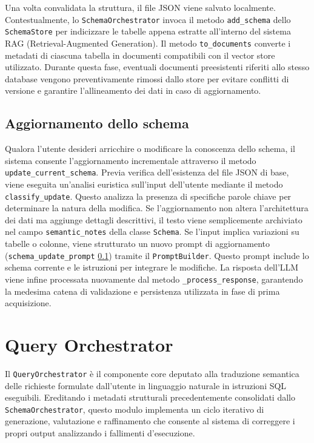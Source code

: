 Una volta convalidata la struttura, il file JSON viene salvato
localmente. Contestualmente, lo \texttt{SchemaOrchestrator} invoca il
metodo \texttt{add\_schema} dello \texttt{SchemaStore} per indicizzare
le tabelle appena estratte all'interno del sistema RAG
(Retrieval-Augmented Generation). Il metodo
\texttt{to\_documents} converte i metadati di ciascuna tabella in
documenti compatibili con il vector store utilizzato. Durante questa
fase, eventuali documenti preesistenti riferiti allo stesso database
vengono preventivamente rimossi dallo store per evitare conflitti di
versione e garantire l'allineamento dei dati in caso di aggiornamento.

\subsection{Aggiornamento dello
schema}\label{aggiornamento-dello-schema}

Qualora l'utente desideri arricchire o modificare la conoscenza dello
schema, il sistema consente l'aggiornamento incrementale attraverso il
metodo \texttt{update\_current\_schema}. Previa verifica dell'esistenza
del file JSON di base, viene eseguita un'analisi euristica sull'input
dell'utente mediante il metodo \texttt{classify\_update}. Questo
analizza la presenza di specifiche parole chiave per determinare la
natura della modifica. Se l'aggiornamento non altera l'architettura dei
dati ma aggiunge dettagli descrittivi, il testo viene semplicemente
archiviato nel campo \texttt{semantic\_notes} della classe
\texttt{Schema}. Se l'input implica variazioni su tabelle o colonne,
viene strutturato un nuovo prompt di aggiornamento
(\texttt{schema\_update\_prompt} \ref{aggiornamento-dello-schema}) tramite il \texttt{PromptBuilder}.
Questo prompt include lo schema corrente e le istruzioni per integrare
le modifiche. La risposta dell'LLM viene infine processata nuovamente
dal metodo \texttt{\_process\_response}, garantendo la medesima catena
di validazione e persistenza utilizzata in fase di prima acquisizione.

\section{Query Orchestrator}\label{query-orchestrator}

Il \texttt{QueryOrchestrator} è il componente core deputato alla
traduzione semantica delle richieste formulate dall'utente in linguaggio
naturale in istruzioni SQL eseguibili. Ereditando i metadati strutturali
precedentemente consolidati dallo \texttt{SchemaOrchestrator}, questo
modulo implementa un ciclo iterativo di generazione, valutazione e
raffinamento che consente al sistema di correggere i propri output
analizzando i fallimenti d'esecuzione.

